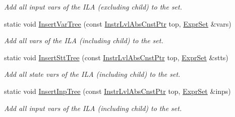 \begin{DoxyCompactItemize}
\begin{DoxyCompactList}\small\item\em Add all input vars of the I\+LA (excluding child) to the set. \end{DoxyCompactList}\item 
\mbox{\label{classilang_1_1_abs_knob_ab0a1f90a220a83444fe2ae44b1d55db2}} 
static void \mbox{\hyperlink{classilang_1_1_abs_knob_ab0a1f90a220a83444fe2ae44b1d55db2}{Insert\+Var\+Tree}} (const \mbox{\hyperlink{namespaceilang_adc86156b73aa1a4b6369645e9b96ff19}{Instr\+Lvl\+Abs\+Cnst\+Ptr}} top, \mbox{\hyperlink{namespaceilang_a54732171848dbcb975458e689024a04c}{Expr\+Set}} \&vars)
\begin{DoxyCompactList}\small\item\em Add all vars of the I\+LA (including child) to the set. \end{DoxyCompactList}\item 
\mbox{\label{classilang_1_1_abs_knob_aacce3e5a4af998d727c6004efcad5677}} 
static void \mbox{\hyperlink{classilang_1_1_abs_knob_aacce3e5a4af998d727c6004efcad5677}{Insert\+Stt\+Tree}} (const \mbox{\hyperlink{namespaceilang_adc86156b73aa1a4b6369645e9b96ff19}{Instr\+Lvl\+Abs\+Cnst\+Ptr}} top, \mbox{\hyperlink{namespaceilang_a54732171848dbcb975458e689024a04c}{Expr\+Set}} \&stts)
\begin{DoxyCompactList}\small\item\em Add all state vars of the I\+LA (including child) to the set. \end{DoxyCompactList}\item 
\mbox{\label{classilang_1_1_abs_knob_a80c8e434f7695917b8bbbe52e94edf53}} 
static void \mbox{\hyperlink{classilang_1_1_abs_knob_a80c8e434f7695917b8bbbe52e94edf53}{Insert\+Inp\+Tree}} (const \mbox{\hyperlink{namespaceilang_adc86156b73aa1a4b6369645e9b96ff19}{Instr\+Lvl\+Abs\+Cnst\+Ptr}} top, \mbox{\hyperlink{namespaceilang_a54732171848dbcb975458e689024a04c}{Expr\+Set}} \&inps)
\begin{DoxyCompactList}\small\item\em Add all input vars of the I\+LA (including child) to the set. \end{DoxyCompactList}\item 
\mbox{\label{classilang_1_1_abs_knob_acf0ea2a428ee265e80cc3e04ab1352ca}} 

\end{DoxyCompactItemize}
